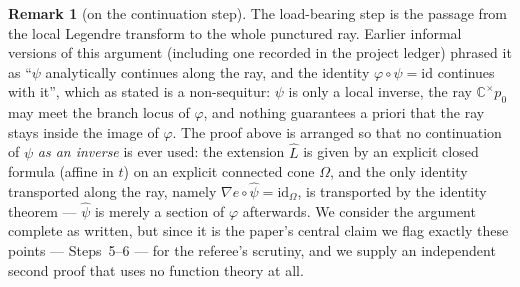 \documentclass[11pt]{article}
\theoremstyle{plain}
\theoremstyle{definition}
\newtheorem{remark}[theorem]{Remark}
\newcommand{\C}{\mathbb{C}}
\begin{document}
\begin{remark}[on the continuation step]\label{rem:cont}
The load-bearing step is the passage from the local Legendre transform to
the whole punctured ray. Earlier informal versions of this argument
(including one recorded in the project ledger) phrased it as ``$\psi$
analytically continues along the ray, and the identity
$\varphi\circ\psi=\mathrm{id}$ continues with it'', which as stated is a
non-sequitur: $\psi$ is only a local inverse, the ray $\C^{\times}p_0$
may meet the branch locus of $\varphi$, and nothing guarantees a priori
that the ray stays inside the image of $\varphi$. The proof above is
arranged so that no continuation of $\psi$ \emph{as an inverse} is ever
used: the extension $\widehat L$ is given by an explicit closed formula
(affine in $t$) on an explicit connected cone $\Omega$, and the only
identity transported along the ray, namely
$\nabla e\circ\widehat\psi=\mathrm{id}_\Omega$, is transported by the
identity theorem --- $\widehat\psi$ is merely a section of $\varphi$
afterwards. We consider the argument complete as written, but since it is
the paper's central claim we flag exactly these points --- Steps~5--6 ---
for the referee's scrutiny, and we supply an independent second proof
that uses no function theory at all.
\end{remark}
\end{document}
